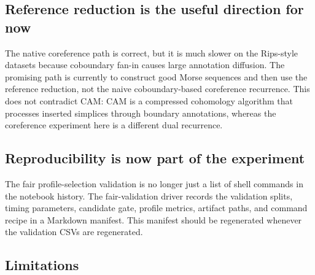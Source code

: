 \documentclass[11pt]{article}
\begin{document}
\subsection{Reference reduction is the useful direction for now}
The native coreference path is correct, but it is much slower on the Rips-style datasets
because coboundary fan-in causes large annotation diffusion.  The promising path is
currently to construct good Morse sequences and then use the reference reduction, not the
naive coboundary-based coreference recurrence.  This does not contradict CAM: CAM is a
compressed cohomology algorithm that processes inserted simplices through boundary
annotations, whereas the coreference experiment here is a different dual recurrence.

\subsection{Reproducibility is now part of the experiment}
The fair profile-selection validation is no longer just a list of shell commands in the
notebook history.  The fair-validation driver records the validation splits, timing
parameters, candidate gate, profile metrics, artifact paths, and command recipe in a
Markdown manifest.  This manifest should be regenerated whenever the validation CSVs are
regenerated.

\subsection{Limitations}
\end{document}
